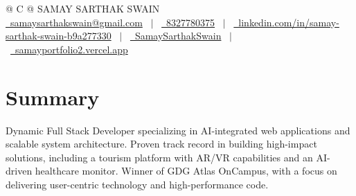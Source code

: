 \documentclass[a4paper,12pt]{article}
\begin{document}
\pagestyle{empty} 



\begin{tabularx}{\linewidth}{@{} C @{}}
\Huge{SAMAY SARTHAK SWAIN} \\[7.5pt]
\href{mailto:samaysarthakswain@gmail.com}{\raisebox{-0.05\height}\faEnvelope \ samaysarthakswain@gmail.com} \ $|$ \ 
\href{tel:+918327780375}{\raisebox{-0.05\height}\faMobile \ 8327780375} \ $|$ \ 
\href{https://linkedin.com/in/samay-sarthak-swain-b9a277330}{\raisebox{-0.05\height}\faLinkedin\ linkedin.com/in/samay-sarthak-swain-b9a277330} \ $|$ \ 
\href{https://github.com/SamaySarthakSwain}{\raisebox{-0.05\height}\faGithub\ SamaySarthakSwain} \ $|$ \ 
\href{https://samayportfolio2.vercel.app}{\raisebox{-0.05\height}\faGlobe \ samayportfolio2.vercel.app} \\
\end{tabularx}

\section{Summary}
Dynamic Full Stack Developer specializing in AI-integrated web applications and scalable system architecture. Proven track record in building high-impact solutions, including a tourism platform with AR/VR capabilities and an AI-driven healthcare monitor. Winner of GDG Atlas OnCampus, with a focus on delivering user-centric technology and high-performance code.

\end{document}
